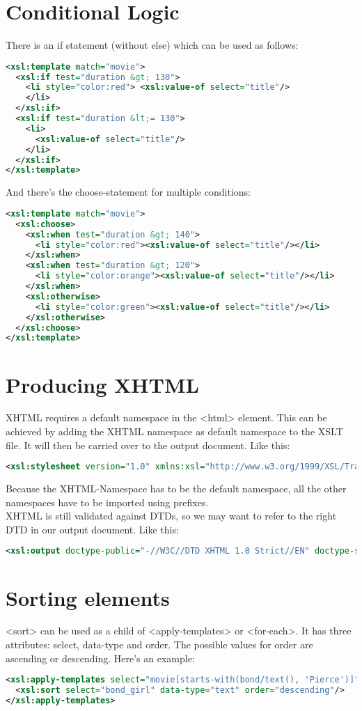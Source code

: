 \section {Conditional Logic}
There is an if statement (without else) which can be used as follows:
\begin{lstlisting}[language=XML]
<xsl:template match="movie">
  <xsl:if test="duration &gt; 130">
    <li style="color:red"> <xsl:value-of select="title"/>
    </li>
  </xsl:if>
  <xsl:if test="duration &lt;= 130">
    <li>
      <xsl:value-of select="title"/>
    </li>
  </xsl:if>
</xsl:template>
\end{lstlisting}
And there's the choose-statement for multiple conditions:
\begin{lstlisting}[language=XML]
<xsl:template match="movie">
  <xsl:choose>
    <xsl:when test="duration &gt; 140">
      <li style="color:red"><xsl:value-of select="title"/></li>
    </xsl:when>
    <xsl:when test="duration &gt; 120">
      <li style="color:orange"><xsl:value-of select="title"/></li>
    </xsl:when>
    <xsl:otherwise>
      <li style="color:green"><xsl:value-of select="title"/></li>
    </xsl:otherwise>
  </xsl:choose>
</xsl:template>
\end{lstlisting}

\section{Producing XHTML}
XHTML requires a default namespace in the <html> element. This can be achieved by adding the XHTML namespace as
default namespace to the XSLT file. It will then be carried over to the output document. Like this:
\begin{lstlisting}[language=XML]
<xsl:stylesheet version="1.0" xmlns:xsl="http://www.w3.org/1999/XSL/Transform" xmlns="http://www.w3.org/1999/xhtml" >
\end{lstlisting}
Because the XHTML-Namespace has to be the default namespace, all the other namespaces have to be imported using prefixes.\\
XHTML is still validated against DTDs, so we may want to refer to the right DTD in our output document. Like this:
\begin{lstlisting}[language=XML]
<xsl:output doctype-public="-//W3C//DTD XHTML 1.0 Strict//EN" doctype-system="http://www.w3.org/TR/xhtml1/DTD/xhtml1-strict.dtd" />
\end{lstlisting}


\section{Sorting elements}
<sort> can be used as a child of <apply-templates> or <for-each>.
It has three attributes: select, data-type and order. The possible values for order are ascending or descending. Here's an example:
\begin{lstlisting}[language=XML]
<xsl:apply-templates select="movie[starts-with(bond/text(), 'Pierce')]">
  <xsl:sort select="bond_girl" data-type="text" order="descending"/>
</xsl:apply-templates>
\end{lstlisting}

